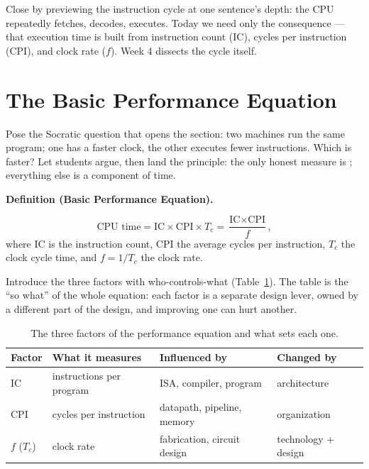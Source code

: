 \documentclass[11pt]{article}
\newenvironment{definitionbox}[1]{%
  \par\noindent\textbf{Definition (#1).}\ \itshape
}{\par\vspace{0.3em}}
\begin{document}
Close by previewing the instruction cycle at one sentence's depth: the CPU repeatedly fetches, decodes, executes. Today we need only the consequence --- that execution time is built from instruction count (IC), cycles per instruction (CPI), and clock rate ($f$). Week 4 dissects the cycle itself.

\section{The Basic Performance Equation}

Pose the Socratic question that opens the section: two machines run the same program; one has a faster clock, the other executes fewer instructions. Which is faster? Let students argue, then land the principle: the only honest measure is ; everything else is a component of time.

\begin{definitionbox}{Basic Performance Equation}
\[
  \text{CPU time} = \text{IC} \times \text{CPI} \times T_c = \frac{\text{IC} \times \text{CPI}}{f},
\]
where $\text{IC}$ is the instruction count, $\text{CPI}$ the average cycles per instruction, $T_c$ the clock cycle time, and $f = 1/T_c$ the clock rate.
\end{definitionbox}

Introduce the three factors with who-controls-what (Table~\ref{tab:factors}). The table is the ``so what'' of the whole equation: each factor is a separate design lever, owned by a different part of the design, and improving one can hurt another.

\begin{table}[h]
\centering
\small
\renewcommand{\arraystretch}{1.15}
\begin{tabular}{@{}p{3.2cm}p{3.6cm}p{3.6cm}p{3.6cm}@{}}
\toprule
\textbf{Factor} & \textbf{What it measures} & \textbf{Influenced by} & \textbf{Changed by} \\
\midrule
$\text{IC}$ & instructions per program & ISA, compiler, program & architecture \\
$\text{CPI}$ & cycles per instruction & datapath, pipeline, memory & organization \\
$f$ ($T_c$) & clock rate & fabrication, circuit design & technology + design \\
\bottomrule
\end{tabular}
\caption{The three factors of the performance equation and what sets each one.}
\label{tab:factors}
\end{table}
\end{document}
